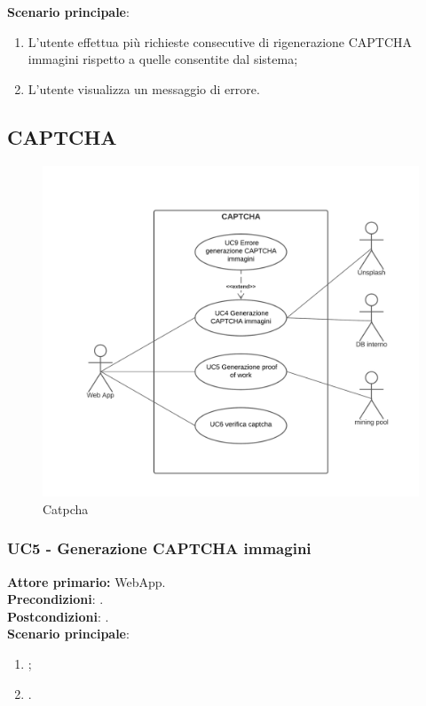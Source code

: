 \textbf{Scenario principale}:
\begin{enumerate}
    \item L'utente effettua più richieste consecutive di rigenerazione CAPTCHA immagini rispetto a quelle consentite dal sistema;
	\item L’utente visualizza un messaggio di errore.
\end{enumerate}

\subsection{CAPTCHA}

\begin{figure}[H]
    \centering
    \includegraphics[scale=0.4]{img/catpcha.png}
    \caption{Catpcha}
\end{figure}


\subsubsection{UC5 - Generazione CAPTCHA immagini}
\textbf{Attore primario:} WebApp.\\
\textbf{Precondizioni}: .\\
\textbf{Postcondizioni}: .\\

\textbf{Scenario principale}:
\begin{enumerate}
    \item ;
	\item .
\end{enumerate}

